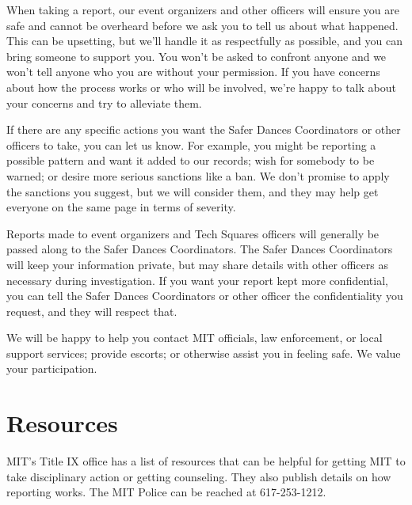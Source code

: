 \documentclass{article}
\begin{document}
When taking a report, our event organizers and other officers will ensure you are safe and cannot be overheard before we ask you to tell us about what happened. This can be upsetting, but we'll handle it as respectfully as possible, and you can bring someone to support you. You won't be asked to confront anyone and we won't tell anyone who you are without your permission. If you have concerns about how the process works or who will be involved, we’re happy to talk about your concerns and try to alleviate them.

If there are any specific actions you want the Safer Dances Coordinators or other officers to take, you can let us know. For example, you might be reporting a possible pattern and want it added to our records; wish for somebody to be warned; or desire more serious sanctions like a ban. We don’t promise to apply the sanctions you suggest, but we will consider them, and they may help get everyone on the same page in terms of severity.

Reports made to event organizers and Tech Squares officers will generally be passed along to the Safer Dances Coordinators. The Safer Dances Coordinators will keep your information private, but may share details with other officers as necessary during investigation. If you want your report kept more confidential, you can tell the Safer Dances Coordinators or other officer the confidentiality you request, and they will respect that.

We will be happy to help you contact MIT officials, law enforcement, or local support services; provide escorts; or otherwise assist you in feeling safe. We value your participation.

\section{Resources}

MIT’s Title IX office has a list of resources that can be helpful for getting MIT to take disciplinary action or getting counseling. They also publish details on how reporting works. The MIT Police can be reached at 617-253-1212.
\end{document}
